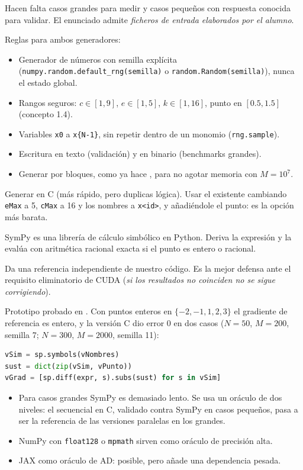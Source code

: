 \porque Hacen falta casos grandes para medir y casos pequeños con respuesta conocida para validar. El enunciado admite \emph{ficheros de entrada elaborados por el alumno}.

\como Reglas para ambos generadores:
\begin{itemize}
\item Generador de números con semilla explícita (\texttt{numpy.random.default\_rng(semilla)} o \texttt{random.Random(semilla)}), nunca el estado global.
\item Rangos seguros: $c\in[1,9]$, $e\in[1,5]$, $k\in[1,16]$, punto en $[0.5,1.5]$ (concepto 1.4).
\item Variables \texttt{x0} a \texttt{x\{N-1\}}, sin repetir dentro de un monomio (\texttt{rng.sample}).
\item Escritura en texto (validación) y en binario (benchmarks grandes).
\item Generar por bloques, como ya hace , para no agotar memoria con $M=10^7$.
\end{itemize}

\alt Generar en C (más rápido, pero duplicas lógica). Usar el  existente cambiando \texttt{eMax} a 5, \texttt{cMax} a 16 y los nombres a \texttt{x<id>}, y añadiéndole el punto: es la opción más barata.

\que SymPy es una librería de cálculo simbólico en Python. Deriva la expresión y la evalúa con aritmética racional exacta si el punto es entero o racional.

\porque Da una referencia independiente de nuestro código. Es la mejor defensa ante el requisito eliminatorio de CUDA (\emph{si los resultados no coinciden no se sigue corrigiendo}).

\como Prototipo probado en . Con puntos enteros en $\{-2,-1,1,2,3\}$ el gradiente de referencia es entero, y la versión C dio error 0 en dos casos ($N=50$, $M=200$, semilla 7; $N=300$, $M=2000$, semilla 11):
\begin{lstlisting}[language=Python]
vSim = sp.symbols(vNombres)
sust = dict(zip(vSim, vPunto))
vGrad = [sp.diff(expr, s).subs(sust) for s in vSim]
\end{lstlisting}

\alt
\begin{itemize}
\item Para casos grandes SymPy es demasiado lento. Se usa un oráculo de dos niveles: el secuencial en C, validado contra SymPy en casos pequeños, pasa a ser la referencia de las versiones paralelas en los grandes.
\item NumPy con \texttt{float128} o \texttt{mpmath} sirven como oráculo de precisión alta.
\item JAX como oráculo de AD: posible, pero añade una dependencia pesada.
\end{itemize}

